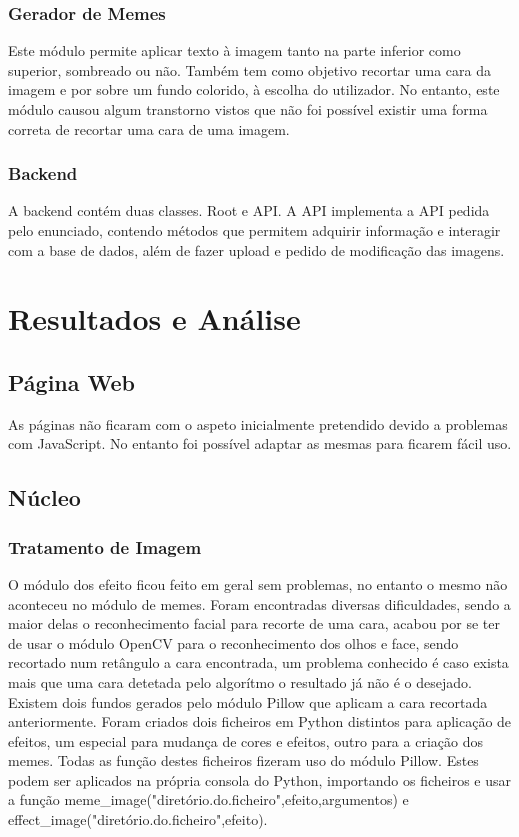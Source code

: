 \documentclass{report}
\begin{document}
\subsection{Gerador de Memes}

Este módulo permite aplicar texto à imagem tanto na parte inferior como superior, sombreado ou não. Também tem como objetivo recortar uma cara da imagem e por sobre um fundo colorido, à escolha do utilizador. No entanto, este módulo causou algum transtorno vistos que não foi possível existir uma forma correta de recortar uma cara de uma imagem.

\subsection{Backend}
A backend contém duas classes. Root e API. A API implementa a API pedida pelo enunciado, contendo métodos que permitem adquirir informação e interagir com a base de dados, além de fazer upload e pedido de modificação das imagens.

\chapter{Resultados e Análise}
\label{chap.res}

\section{Página Web}
	As páginas não ficaram com o aspeto inicialmente pretendido devido a problemas com JavaScript. No entanto foi possível adaptar as mesmas para ficarem fácil uso.
\section{Núcleo}	
\subsection{Tratamento de Imagem}
	O módulo dos efeito ficou feito em geral sem problemas, no entanto o mesmo não aconteceu no módulo de memes. Foram encontradas diversas dificuldades, sendo a maior delas o reconhecimento facial para recorte de uma cara, acabou por se ter de usar o módulo OpenCV para o reconhecimento dos olhos e face, sendo recortado num retângulo a cara encontrada, um problema conhecido é caso exista mais que uma cara detetada pelo algorítmo o resultado já não é o desejado. Existem dois fundos gerados pelo módulo Pillow que aplicam a cara recortada anteriormente.
	Foram criados dois ficheiros em Python distintos para aplicação de efeitos, um especial para mudança de cores e efeitos, outro para a criação dos memes. Todas as função destes ficheiros fizeram uso do módulo Pillow. Estes podem ser aplicados na própria consola do Python, importando os ficheiros e usar a função meme\_image("diretório.do.ficheiro",efeito,argumentos) 
e effect\_image("diretório.do.ficheiro",efeito).
\end{document}
